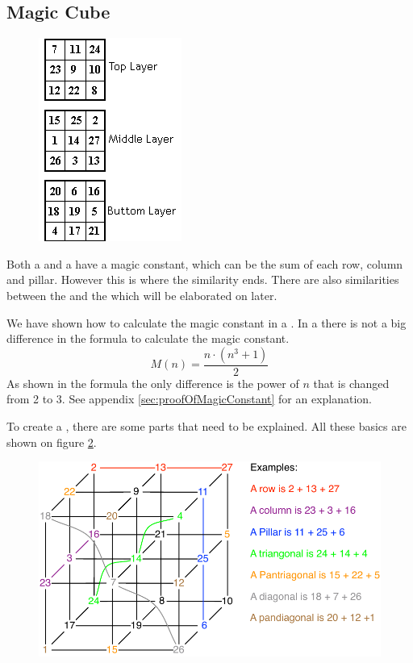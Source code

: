 \subsection{Magic Cube}
\label{sub:mcube}
\begin{figure}[h]
	\centering
		\includegraphics[scale=0.8]{input/pics/presentMagicCube2}
	\caption{}
	\label{fig:presentMagicCube}
\end{figure}

Both a \msquare{} and a \mcube{} have a magic constant, which can be the sum of each row, column and pillar. However this is where the similarity ends. There are also similarities between the \mcube{} and the \rubik{} which will be elaborated on later.

We have shown how to calculate the magic constant in a \msquare{}.
In a  \mcube{} there is not a big difference in the formula to calculate the magic constant.
\begin{equation}
	M(n)=\frac{n \cdot (n^3+1)}{2}
\end{equation}
As shown in the formula the only difference is the power of $n$ that is changed from 2 to 3.
See appendix \ref{sec:proofOfMagicConstant} for an explanation.

To create a  \mcube{}, there are some parts that need to be explained.
All these basics are shown on figure \ref{fig:cubeparts}.

\begin{figure}[h]
	\centering
		\includegraphics[scale=0.5]{input/pics/cubeparts.pdf}
	\caption{}
	\label{fig:cubeparts}
\end{figure}

